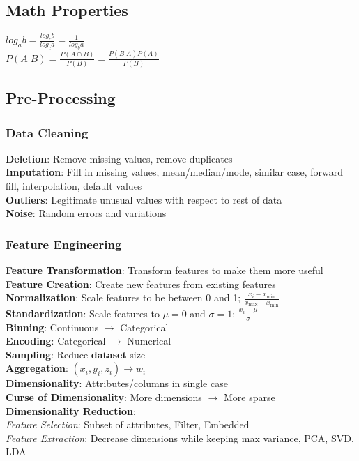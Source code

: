 \documentclass{article}
\author{Ian Chen}
\date{\today}
\begin{document}
    \begin{multicols*}{2}
        \subsection*{Math Properties}
        $log_a b = \frac{log_c b}{log_c a} = \frac{1}{log_b a}$\\
        $P(A|B) = \frac{P(A \cap B)}{P(B)} = \frac{P(B|A)P(A)}{P(B)}$\\
        \subsection*{Pre-Processing}
        \subsubsection*{Data Cleaning}
        \textbf{Deletion}: Remove missing values, remove duplicates\\
        \textbf{Imputation}: Fill in missing values, mean/median/mode, similar case, forward fill,
        interpolation, default values\\
        \textbf{Outliers}: Legitimate unusual values with respect to rest of data\\
        \textbf{Noise}: Random errors and variations\\
        \subsubsection*{Feature Engineering}
        \textbf{Feature Transformation}: Transform features to make them more useful\\
        \textbf{Feature Creation}: Create new features from existing features\\
        \textbf{Normalization}: Scale features to be between 0 and 1; $\frac{x_i - x_{\min}}{x_
                {\max} - x_{\min}}$\\
        \textbf{Standardization}: Scale features to $\mu = 0$ and $\sigma = 1$; $\frac{x_i - \mu}{
            \sigma}$\\
        \textbf{Binning}: Continuous $\to$ Categorical\\
        \textbf{Encoding}: Categorical $\to$ Numerical\\
        \textbf{Sampling}: Reduce \textbf{dataset} size\\
        \textbf{Aggregation}: $(x_i, y_i, z_i) \to w_i$\\
        \textbf{Dimensionality}: Attributes/columns in single case\\
        \textbf{Curse of Dimensionality}: More dimensions $\to$ More sparse\\
        \textbf{Dimensionality Reduction}:\\
        \textit{Feature Selection}: Subset of attributes, Filter, Embedded\\
        \textit{Feature Extraction}: Decrease dimensions while keeping max variance, PCA, SVD, LDA\\

\end{multicols*}
\end{document}

